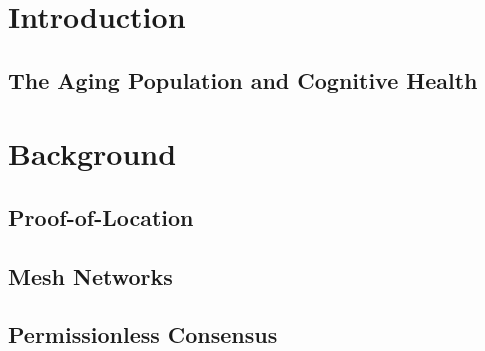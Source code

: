 


\newpage
\section{Introduction} \label{sec:introduction}



\subsection{The Aging Population and Cognitive Health} \label{sec:aging-population}


% 

\newpage
\section{Background} \label{sec:background}



\subsection{Proof-of-Location} \label{sec:background-proof-of-location}



\subsection{Mesh Networks} \label{sec:background-wireless-mesh-networks}



\subsection{Permissionless Consensus} \label{sec:background-permissionless-consensus}



